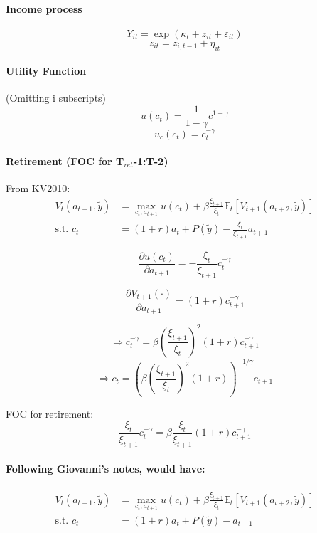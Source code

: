 \documentclass[11pt]{article}
\begin{document}
\paragraph{Income process}
$$ Y_{i t} =  \exp( \kappa_t + z_{i t} + \varepsilon_{i t})$$
$$ z_{i t} = z_{i,t-1} + \eta_{i t} $$


\paragraph{Utility Function}
(Omitting i subscripts)
$$ u(c_t) = \frac{1}{1-\gamma} c^{1-\gamma} $$
$$ u_c(c_t) = c_t^{-\gamma} $$

\paragraph{Retirement (FOC for T$_{ret}$-1:T-2)}

From KV2010:
\begin{equation*}
\begin{split}
 V_{t}(a_{t+1}, \tilde{y}) &= \max_{c_t,a_{t+1}} u(c_{t}) + \beta \frac{\xi_{t+1}}{\xi_{t}} \mathbb{E}_t[V_{t+1}(a_{t+2}, \tilde{y})] \\
  \text{s.t. } c_t &= (1+r) a_{t}+P(\tilde{y}) - \frac{\xi_{t}}{\xi_{t+1}} a_{t+1}
\end{split}
\end{equation*}

$$ \frac{\partial{u(c_t)}}{\partial{a_{t+1}}} = -\frac{\xi_t}{\xi_{t+1}} c_t^{-\gamma} $$

$$ \frac{\partial{V_{t+1}(\cdot)}}{\partial{a_{t+1}}} = (1+r) c_{t+1}^{-\gamma} $$

$$ \Rightarrow c_t^{-\gamma} = \beta \left(
    \frac{\xi_{t+1}}{\xi_t} \right) ^2 (1+r) c_{t+1}^{-\gamma} $$
$$ \Rightarrow c_t = \left(\beta \left(
    \frac{\xi_{t+1}}{\xi_t} \right) ^2 (1+r) \right)^{-1/\gamma} c_{t+1} $$

FOC for retirement:
$$ \frac{\xi_t}{\xi_{t+1}} c_t^{-\gamma} = \beta \frac{\xi_t}{\xi_{t+1}} (1+r) c_{t+1}^{-\gamma} $$


\paragraph{Following Giovanni's notes, would have:}
\begin{equation*}
\begin{split}
 V_{t}(a_{t+1}, \tilde{y}) &= \max_{c_t,a_{t+1}} u(c_{t}) + \beta \frac{\xi_{t+1}}{\xi_{t}} \mathbb{E}_t[V_{t+1}(a_{t+2}, \tilde{y})] \\
 \text{s.t. } c_t &= (1+r) a_{t}+P(\tilde{y}) - a_{t+1}
\end{split}
\end{equation*}
\end{document}
